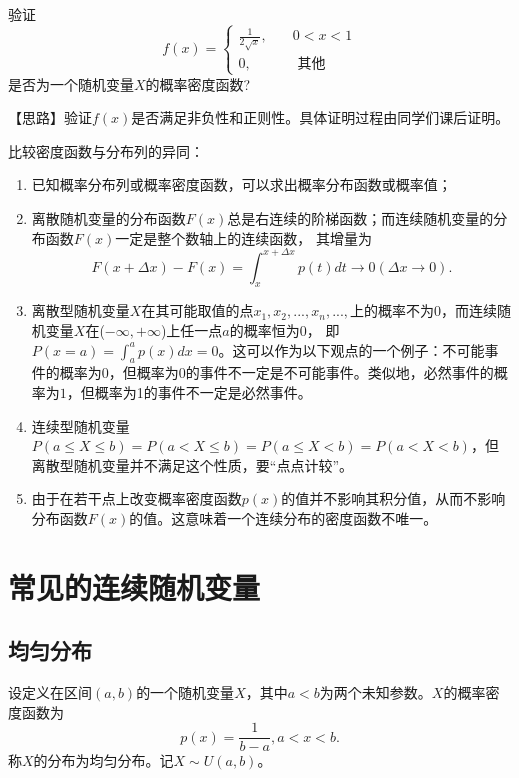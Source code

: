 \begin{example}
验证$$f(x)=\left\{\begin{aligned}
\frac{1}{2 \sqrt{x}}, &\quad  0<x<1 \\
0, & \quad \text { 其他 }
\end{aligned}\right.$$
是否为一个随机变量$X$的概率密度函数?\\
\end{example}
\begin{solution}
    【思路】验证$f(x)$是否满足非负性和正则性。具体证明过程由同学们课后证明。
    \vspace{3cm}
\end{solution}
\begin{remark}
    比较密度函数与分布列的异同：
    \begin{enumerate}
 \item 已知概率分布列或概率密度函数，可以求出概率分布函数或概率值；
 \item 离散随机变量的分布函数$F(x)$总是右连续的阶梯函数；而连续随机变量的分布函数$F(x)$一定是整个数轴上的连续函数，
 其增量为
$$F(x+\Delta x)-F(x)=\int_{x}^{x+\Delta x} p(t) d t \rightarrow 0(\Delta x \rightarrow 0).$$
 \item  离散型随机变量$X$在其可能取值的点$x_1,x_2,...,x_n,...,$上的概率不为$0$，而连续随机变量$X$在($-\infty,+\infty$)上任一点$a$的概率恒为$0$， 即 $P(x=a)=\int_{a}^{a} p(x) d x=0 $。这可以作为以下观点的一个例子：不可能事件的概率为$0$，但概率为$0$的事件不一定是不可能事件。类似地，必然事件的概率为$1$，但概率为1的事件不一定是必然事件。
 \item 连续型随机变量$P(a \leq X \leq b)=P(a<X \leq b)=P(a \leq X<b)=P(a<X<b)$，但离散型随机变量并不满足这个性质，要“点点计较”。
\item 由于在若干点上改变概率密度函数$p(x)$的值并不影响其积分值，从而不影响分布函数$F(x)$的值。这意味着一个连续分布的密度函数不唯一。
\end{enumerate}
\end{remark}
\section{常见的连续随机变量}
\subsection{均匀分布}
\begin{definition}\label{def:uniform_dist}
设定义在区间$(a,b)$的一个随机变量$X$，其中$a<b$为两个未知参数。$X$的概率密度函数为
$$
p(x) = \frac{1}{b-a}, a< x<b.
$$
称$X$的分布为均匀分布。记$X\sim U(a,b)$。
\end{definition}

